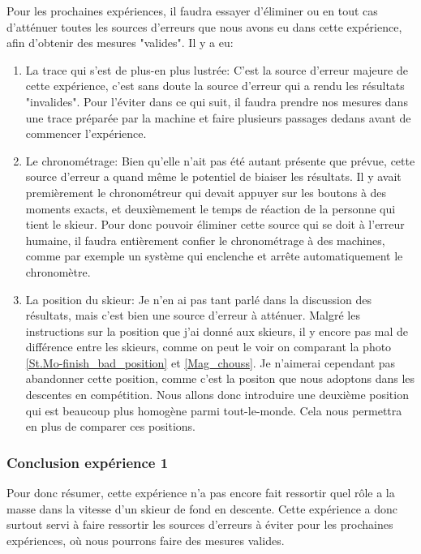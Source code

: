 \documentclass{article}
\begin{document}
Pour les prochaines expériences, il faudra essayer d'éliminer ou en tout cas d'atténuer toutes les sources d'erreurs que nous avons eu dans cette expérience, afin d'obtenir des mesures "valides". Il y a eu:
\begin{enumerate}
    \item La trace qui s'est de plus-en plus lustrée: C'est la source d'erreur majeure de cette expérience, c'est sans doute la source d'erreur qui a rendu les résultats "invalides". Pour l'éviter dans ce qui suit, il faudra prendre nos mesures dans une trace préparée par la machine et faire plusieurs passages dedans avant de commencer l'expérience.
    
    \item Le chronométrage: Bien qu'elle n'ait pas été autant présente que prévue, cette source d'erreur a quand même le potentiel de biaiser les résultats. Il y avait premièrement le chronométreur qui devait appuyer sur les boutons à des moments exacts, et deuxièmement le temps de réaction de la personne qui tient le skieur. Pour donc pouvoir éliminer cette source qui se doit à l'erreur humaine, il faudra entièrement confier le chronométrage à des machines, comme par exemple un système qui enclenche et arrête automatiquement le chronomètre.

    \item La position du skieur: Je n'en ai pas tant parlé dans la discussion des résultats, mais c'est bien une source d'erreur à atténuer. Malgré les instructions sur la position que j'ai donné aux skieurs, il y encore pas mal de différence entre les skieurs, comme on peut le voir on comparant la photo \ref{St.Mo-finish_bad_position} et \ref{Mag_chouss}. Je n'aimerai cependant pas abandonner cette position, comme c'est la positon que nous adoptons dans les descentes en compétition. Nous allons donc introduire une deuxième position qui est beaucoup plus homogène parmi tout-le-monde. Cela nous permettra en plus de comparer ces positions. 
\end{enumerate}

\subsubsection{Conclusion expérience 1}
Pour donc résumer, cette expérience n'a pas encore fait ressortir quel rôle a la masse dans la vitesse d'un skieur de fond en descente. Cette expérience a donc surtout servi à faire ressortir les sources d'erreurs à éviter pour les prochaines expériences, où nous pourrons faire des mesures valides. 
\end{document}
